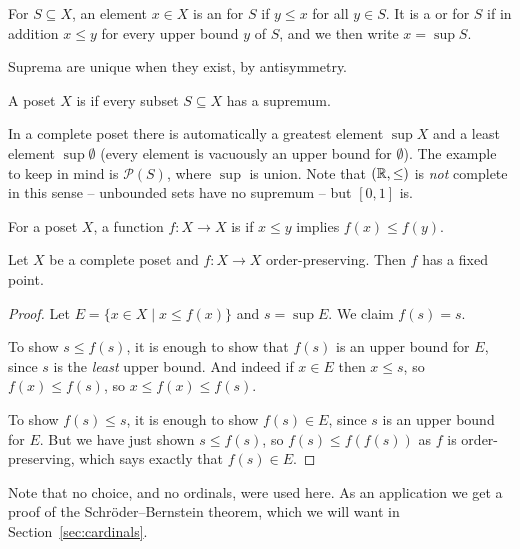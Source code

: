 \documentclass[a4paper]{scrartcl}
\begin{document}
\begin{definition}
  For $S \subseteq X$, an element $x \in X$ is an  for $S$ if $y \leq x$ for all $y \in S$. It is a  or  for $S$ if in addition $x \leq y$ for every upper bound $y$ of $S$, and we then write $x = \sup S$.
\end{definition}

Suprema are unique when they exist, by antisymmetry.

\begin{definition}
  A poset $X$ is  if every subset $S \subseteq X$ has a supremum.
\end{definition}

In a complete poset there is automatically a greatest element $\sup X$ and a least element $\sup \emptyset$ (every element is vacuously an upper bound for $\emptyset$). The example to keep in mind is $\mathcal{P}(S)$, where $\sup$ is union. Note that $(\mathbb{R}, \leq)$ is \emph{not} complete in this sense -- unbounded sets have no supremum -- but $[0,1]$ is.

\begin{definition}
  For a poset $X$, a function $f: X \rightarrow X$ is  if $x \leq y$ implies $f(x) \leq f(y)$.
\end{definition}

\begin{theorem}\label{thm:knastertarski}
  Let $X$ be a complete poset and $f: X \rightarrow X$ order-preserving. Then $f$ has a fixed point.
\end{theorem}
\begin{proof}
  Let $E = \{x \in X \mid x \leq f(x)\}$ and $s = \sup E$. We claim $f(s) = s$.

  To show $s \leq f(s)$, it is enough to show that $f(s)$ is an upper bound for $E$, since $s$ is the \emph{least} upper bound. And indeed if $x \in E$ then $x \leq s$, so $f(x) \leq f(s)$, so $x \leq f(x) \leq f(s)$.

  To show $f(s) \leq s$, it is enough to show $f(s) \in E$, since $s$ is an upper bound for $E$. But we have just shown $s \leq f(s)$, so $f(s) \leq f(f(s))$ as $f$ is order-preserving, which says exactly that $f(s) \in E$.
\end{proof}

Note that no choice, and no ordinals, were used here. As an application we get a proof of the Schr\"oder--Bernstein theorem, which we will want in Section~\ref{sec:cardinals}.
\end{document}
